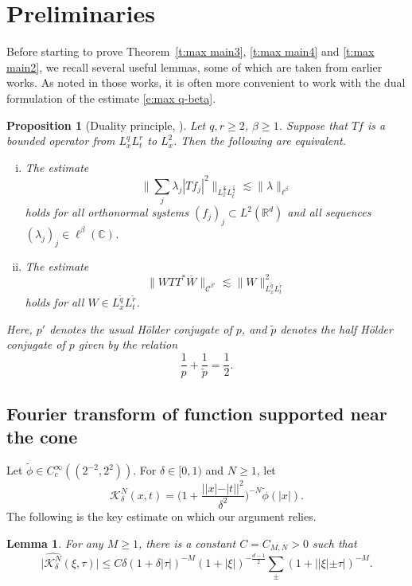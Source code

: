 \documentclass[a4paper]{amsart}
\numberwithin{figure}{section}
\numberwithin{equation}{section}%
\theoremstyle{plain}%
\newtheorem{lemma}[theorem]{Lemma}
\newtheorem{proposition}[theorem]{Proposition}
\theoremstyle{definition}
\theoremstyle{remark}%
\newcommand{\R}{{\mathbb R}}
\def\C{\mathcal{C}}
\begin{document}
\section{Preliminaries}
Before starting to prove Theorem~\ref{t:max main3}, \ref{t:max main4} and \ref{t:max main2}, we recall several useful lemmas, some of which are taken from earlier works. 
As noted in those works, it is often more convenient to work with the dual formulation of the estimate \eqref{e:max q-beta}.



\begin{proposition}[Duality principle, \cite{{FS_AJM}, {BHLNS}}] 
    Let $q,r\geq2$, $\beta\geq1$. Suppose that $Tf$ is a bounded operator from $L^{q}_xL^{r}_t$ to $L^2_x$.  Then the following are equivalent.
    \begin{enumerate}[(i)]
        \item The estimate 
        \[
        \Big\| \sum_j \lambda_j |Tf_j|^2 \Big\|_{L^{\frac q2}_xL^{\frac r2}_t}
        \lesssim
        \|\lambda\|_{\ell^\beta}
        \]
        holds for all orthonormal systems $(f_j)_j\subset L^2(\R^d)$ and all sequences $(\lambda_j)_j\in \ell^\beta(\mathbb C)$.
        \item The estimate 
        \[
        \|WTT^*\overline{W}\|_{\C^{\beta'}}
        \lesssim
        \|W\|_{L^{\tilde{q}}_xL^{\tilde{r}}_t}^2
        \]
        holds for all $W\in L^{\tilde{q}}_xL^{\tilde{r}}_t$.
    \end{enumerate}
    Here, $p'$ denotes the usual H\"older conjugate of $p$, and $\tilde{p}$ denotes the half H\"older conjugate of $p$  given by the relation
    \[
    \frac1p + \frac{1}{\tilde{p}}=\frac12.
    \]
\end{proposition}


\subsection*{Fourier transform of function supported near the cone}
Let  $\tilde \phi \in C_c^\infty((2^{-2}, 2^2))$.
For $\delta\in [0,1)$ and $N\ge1$, let 
\[   \mathcal K_\delta^N (x,t)=  \Big(1+\frac{||x|-|t||^2}{\delta^2}\Big)^{-N} \tilde\phi(|x|). \]  
The following is the key estimate on which our argument relies.

\begin{lemma}
\label{l:dispersive2}  
For any $M\ge 1$, there is a constant $C=C_{M,N}>0$ such that
\[
\big| \widehat{\mathcal K_\delta^N}(\xi,\tau)| \le C \delta (1+\delta|\tau|)^{-M} (1+|\xi|)^{-\frac{d-1}2} \sum_{\pm}(1+||\xi|\pm \tau|)^{-M}.
\]
\end{lemma}
\end{document}
